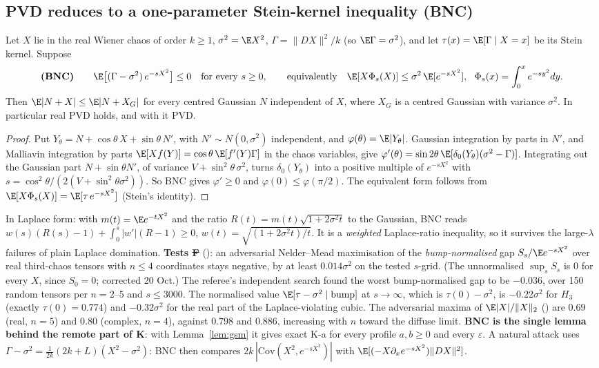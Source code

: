 \subsection{PVD reduces to a one-parameter Stein-kernel inequality (BNC)}\label{sec:bnc}
\begin{proposition}[\st{P}]\label{prop:bnc}
Let $X$ lie in the real Wiener chaos of order $k\ge1$, $\sigma^2=\E X^2$, $\Gamma=\|DX\|^2/k$ (so $\E\Gamma=\sigma^2$), and let $\tau(x)=\E[\Gamma\mid X=x]$ be its Stein kernel. Suppose
\[
\textbf{(BNC)}\qquad \E\bigl[(\Gamma-\sigma^2)\,e^{-sX^2}\bigr]\le0\quad\text{for every }s\ge0,
\qquad\text{equivalently}\quad \E[X\Phi_s(X)]\le\sigma^2\,\E[e^{-sX^2}],\ \ \Phi_s(x)=\int_0^xe^{-sy^2}dy .
\]
Then $\E|N+X|\le\E|N+X_G|$ for every centred Gaussian $N$ independent of $X$, where $X_G$ is a centred Gaussian with variance $\sigma^2$. In particular real PVD holds, and with it PVD.
\end{proposition}
\begin{proof}
Put $Y_\theta=N+\cos\theta\,X+\sin\theta\,N'$, with $N'\sim N(0,\sigma^2)$ independent, and $\varphi(\theta)=\E|Y_\theta|$. Gaussian integration by parts in $N'$, and Malliavin integration
by parts $\E[Xf(Y)]=\cos\theta\,\E[f'(Y)\Gamma]$ in the chaos variables, give $\varphi'(\theta)=\sin2\theta\,\E[\delta_0(Y_\theta)(\sigma^2-\Gamma)]$. Integrating out the Gaussian
part $N+\sin\theta N'$, of variance $V+\sin^2\theta\,\sigma^2$, turns $\delta_0(Y_\theta)$ into a positive multiple of $e^{-sX^2}$ with $s=\cos^2\theta/(2(V+\sin^2\theta\sigma^2))$. So BNC
gives $\varphi'\ge0$ and $\varphi(0)\le\varphi(\pi/2)$. The equivalent form follows from $\E[X\Phi_s(X)]=\E[\tau\,e^{-sX^2}]$ (Stein's identity).
\end{proof}
In Laplace form: with $m(t)=\E e^{-tX^2}$ and the ratio $R(t)=m(t)\sqrt{1+2\sigma^2t}$ to the Gaussian, BNC reads $w(s)(R(s)-1)+\int_0^s|w'|(R-1)\ge0$, $w(t)=\sqrt{(1+2\sigma^2t)/t}$. It is a
\emph{weighted} Laplace-ratio inequality, so it survives the large-$\lambda$ failures of plain Laplace domination. \textbf{Tests \st{F}} (): an adversarial Nelder--Mead maximisation
of the \emph{bump-normalised} gap $S_s/\E e^{-sX^2}$ over real third-chaos tensors with $n\le4$ coordinates stays negative, by at least $0.014\sigma^2$ on the tested
$s$-grid. (The unnormalised $\sup_sS_s$ is $0$ for every $X$, since $S_0=0$; corrected 20 Oct.) The referee's independent search found the worst bump-normalised gap to be $-0.036$, over 150
random tensors per $n=2$--$5$ and $s\le3000$. The normalised value $\E[\tau-\sigma^2\mid\text{bump}]$ at
$s\to\infty$, which is $\tau(0)-\sigma^2$, is $-0.22\sigma^2$ for $H_3$ (exactly $\tau(0)=0.774$) and $-0.32\sigma^2$ for the real part of the Laplace-violating cubic. The adversarial maxima
of $\E|X|/\|X\|_2$ () are $0.69$ (real, $n=5$) and $0.80$ (complex, $n=4$), against $0.798$ and $0.886$, increasing with $n$ toward the diffuse limit. \textbf{BNC is the
single lemma behind the remote part of K}: with Lemma~\ref{lem:gsm} it gives exact K-a for every profile $a,b\ge0$ and every $\varepsilon$. A natural attack uses
$\Gamma-\sigma^2=\frac1{2k}(2k+L)(X^2-\sigma^2)$: BNC then compares $2k\,|\mathrm{Cov}(X^2,e^{-sX^2})|$ with $\E[(-X\partial_x e^{-sX^2})\|DX\|^2]$.

